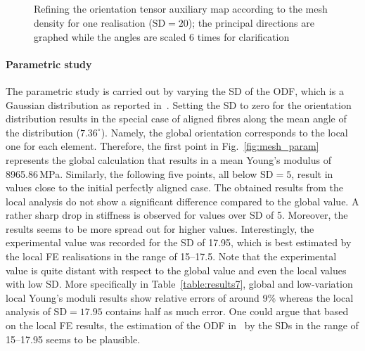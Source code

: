 \begin{figure}[!h]{}
  	\centering
	\\
	\\
	\\
	\\
	\caption{Refining the orientation tensor auxiliary map according to the mesh density for one realisation ($\text{SD}=20$); the principal directions are graphed while the angles are scaled 6 times for clarification}
	\label{fig:tensor_maps}
\end{figure}%


	\paragraph{Parametric study} The parametric study is carried out by varying the SD of the ODF, which is a Gaussian distribution as reported in~\autocite{Virk.2013}. Setting the SD to zero for the orientation distribution results in the special case of aligned fibres along the mean angle of the distribution ($7.36^\circ$). Namely, the global orientation corresponds to the local one for each element. Therefore, the first point in Fig.~\ref{fig:mesh_param} represents the global calculation that results in a mean Young's modulus of 8965.86\,MPa. Similarly, the following five points, all below $\text{SD}=5$, result in values close to the initial perfectly aligned case. The obtained results from the local analysis do not show a significant difference compared to the global value. A rather sharp drop in stiffness is observed for values over SD of 5. Moreover, the results seems to be more spread out for higher values. Interestingly, the experimental value was recorded for the SD of 17.95, which is best estimated by the local FE realisations in the range of 15--17.5. Note that the experimental value is quite distant with respect to the global value and even the local values with low SD. More specifically in Table~\ref{table:results7}, global and low-variation local Young's moduli results show relative errors of around 9\% whereas the local analysis of $\text{SD}=17.95$ contains half as much error. One could argue that based on the local FE results, the estimation of the ODF in~\autocite{Virk.2013} by the SDs in the range of 15--17.95 seems to be plausible.



